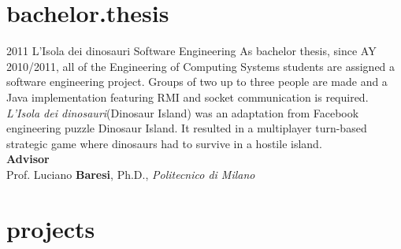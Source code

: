\documentclass[]{friggeri-cv} %
\begin{document}
\newpage
\section{bachelor.thesis}

\begin{entrylist}
\entry
{2011}
{L'Isola dei dinosauri}
{Software Engineering}
{As bachelor thesis, since AY 2010/2011, all of the Engineering of Computing Systems students are assigned a software engineering project. Groups of two up to three people are
made and a Java implementation featuring RMI and socket communication is required. \emph{L'Isola
dei dinosauri}(Dinosaur Island) was an adaptation from Facebook engineering puzzle Dinosaur
Island. It resulted in a multiplayer turn-based strategic game where dinosaurs had to survive in a
hostile island. \\

\textbf{Advisor} \\
Prof. Luciano \textbf{Baresi}, Ph.D., \emph{Politecnico di Milano}}
\end{entrylist}

\section{projects}
\end{document}
